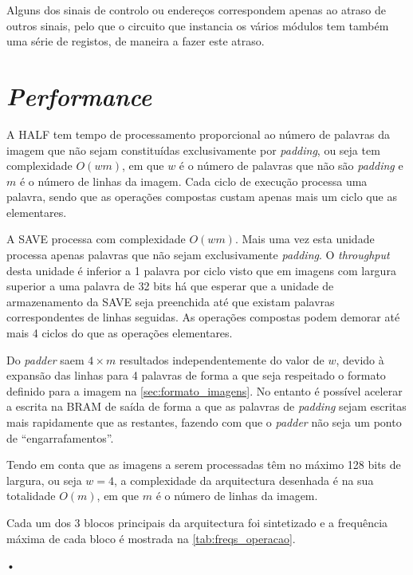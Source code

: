 \documentclass[a4paper]{article}
\begin{document}
Alguns dos sinais de controlo ou endereços correspondem apenas ao atraso de outros sinais, pelo que o circuito que instancia os vários módulos tem também uma série de registos, de maneira a fazer este atraso.

\section{\textit{Performance}}	%

A HALF tem tempo de processamento proporcional ao número de palavras da imagem que não sejam constituídas exclusivamente por \textit{padding}, ou seja tem complexidade $O(w m)$, em que $w$ é o número de palavras que não são \textit{padding} e $m$ é o número de linhas da imagem. Cada ciclo de execução processa uma palavra, sendo que as operações compostas custam apenas mais um ciclo que as elementares.

A SAVE processa com complexidade $O(w m)$. Mais uma vez esta unidade processa apenas palavras que não sejam exclusivamente \textit{padding}. O \textit{throughput} desta unidade é inferior a 1 palavra por ciclo visto que em imagens com largura superior a uma palavra de 32 bits há que esperar que a unidade de armazenamento da SAVE seja preenchida até que existam palavras correspondentes de linhas seguidas. As operações compostas podem demorar até mais 4 ciclos do que as operações elementares.

Do \textit{padder} saem $4\times m$ resultados independentemente do valor de $w$, devido à expansão das linhas para 4 palavras de forma a que seja respeitado o formato definido para a imagem na \autoref{sec:formato_imagens}. No entanto é possível acelerar a escrita na BRAM de saída de forma a que as palavras de \textit{padding} sejam escritas mais rapidamente que as restantes, fazendo com que o \textit{padder} não seja um ponto de ``engarrafamentos''.

Tendo em conta que as imagens a serem processadas têm no máximo 128 bits de largura, ou seja $w=4$, a complexidade da arquitectura desenhada é na sua totalidade $O(m)$, em que $m$ é o número de linhas da imagem.

Cada um dos 3 blocos principais da arquitectura foi sintetizado e a frequência máxima de cada bloco é mostrada na \autoref{tab:freqs_operacao}.

\begin{table}
\centering
•
\caption{•}
\label{tab:freqs_operacao}
\end{table}
\end{document}
